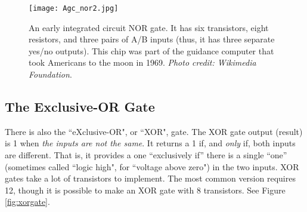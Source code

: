 \bigskip


\begin{figure}[h!]
\begin{center}
\texttt{[image: Agc\_nor2.jpg]}
\caption{An early integrated circuit NOR gate. It has six transistors, eight resistors, and three pairs of A/B inputs (thus, it has three separate yes/no outputs). This chip was part of the guidance computer that took Americans to the moon in 1969. \emph{Photo credit: Wikimedia Foundation}.}
\end{center}
\label{fig:apollonorgate}
\end{figure}


\clearpage
\newpage

\subsection*{The Exclusive-OR Gate}
There is also the ``eXclusive-OR", or ``XOR", gate. The XOR gate output (result) is 1 when \emph{the inputs are not the same}. It returns a 1 if, and \emph{only} if, both inputs are different. That is, it provides a one ``exclusively if'' there is a single ``one'' (sometimes called ``logic high", for ``voltage above zero") in the two inputs. XOR gates take a lot of transistors to implement. The most common version requires 12, though it is possible to make an XOR gate with 8 transistors. See Figure \ref{fig:xorgate}.

